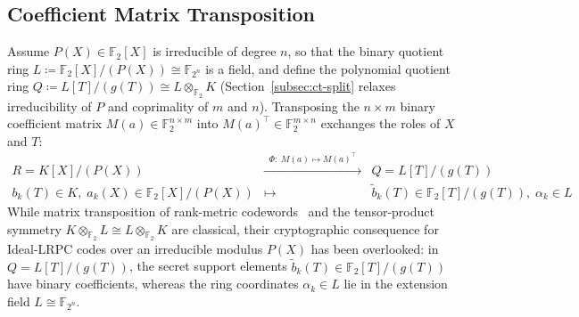 \documentclass[11pt,a4paper]{article}
\theoremstyle{definition}
\theoremstyle{remark}
\newcommand{\F}{\mathbb{F}}
\newcommand{\Ftwo}{\mathbb{F}_2}
\begin{document}
\subsection{Coefficient Matrix Transposition}
Assume $P(X) \in \Ftwo[X]$ is irreducible of degree $n$, so that the binary quotient ring $L \coloneqq \Ftwo[X]/(P(X)) \cong \F_{2^n}$ is a field, and define the polynomial quotient ring $Q \coloneqq L[T]/(g(T)) \cong L \otimes_{\Ftwo} K$ (Section~\ref{subsec:ct-split} relaxes irreducibility of $P$ and coprimality of $m$ and $n$). Transposing the $n \times m$ binary coefficient matrix $M(a) \in \Ftwo^{n \times m}$ into $M(a)^\top \in \Ftwo^{m \times n}$ exchanges the roles of $X$ and $T$:
\[
    \begin{array}{ccc}
    R = K[X]/(P(X)) & \xrightarrow{\;\;\Phi:\; M(a) \mapsto M(a)^\top\;\;} & Q = L[T]/(g(T)) \\[2pt]
    b_k(T) \in K,\; a_k(X) \in \Ftwo[X]/(P(X)) & \longmapsto & \tilde{b}_k(T) \in \Ftwo[T]/(g(T)),\; \alpha_k \in L
    \end{array}
\]
While matrix transposition of rank-metric codewords~\cite{Delsarte78} and the tensor-product symmetry $K \otimes_{\Ftwo} L \cong L \otimes_{\Ftwo} K$ are classical, their cryptographic consequence for Ideal-LRPC codes over an irreducible modulus $P(X)$ has been overlooked: in $Q = L[T]/(g(T))$, the secret support elements $\tilde{b}_k(T) \in \Ftwo[T]/(g(T))$ have binary coefficients, whereas the ring coordinates $\alpha_k \in L$ lie in the extension field $L \cong \F_{2^n}$.
\end{document}
